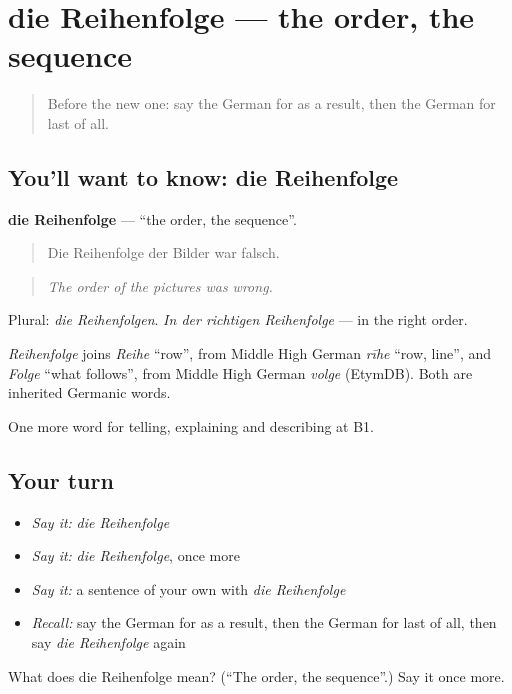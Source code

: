 \section[die Reihenfolge]{die Reihenfolge — the order, the sequence}

\label{lesson:GE-C262-reihenfolge}



\begin{quote}
Before the new one: say the German for as a result, then the German for last of all.
\end{quote}

\subsection*{You'll want to know: die Reihenfolge}
\textbf{die Reihenfolge} — \textquotedblleft{}the order, the sequence\textquotedblright{}.

\begin{quote}
Die Reihenfolge der Bilder war falsch.
\end{quote}

\begin{quote}
\emph{The order of the pictures was wrong.}
\end{quote}

Plural: \emph{die Reihenfolgen}. \emph{In der richtigen Reihenfolge} — in the right order.

\begin{cousinweb}
\emph{Reihenfolge} joins \emph{Reihe} \textquotedblleft{}row\textquotedblright{}, from Middle High German \emph{rīhe} \textquotedblleft{}row, line\textquotedblright{}, and \emph{Folge} \textquotedblleft{}what follows\textquotedblright{}, from Middle High German \emph{volge} (EtymDB). Both are inherited Germanic words.
\end{cousinweb}

\begin{grammarlens}[title={What you've built}]
One more word for telling, explaining and describing at B1.
\end{grammarlens}

\subsection*{Your turn}
\begin{itemize}
\raggedright
  \item \emph{Say it:} \emph{die Reihenfolge}
  \item \emph{Say it:} \emph{die Reihenfolge}, once more
  \item \emph{Say it:} a sentence of your own with \emph{die Reihenfolge}
  \item \emph{Recall:} say the German for as a result, then the German for last of all, then say \emph{die Reihenfolge} again
\end{itemize}

\begin{tcolorbox}[breakable,colback=teal!4,colframe=teal!35!black,title={Before you move on}]
What does die Reihenfolge mean? (\textquotedblleft{}The order, the sequence\textquotedblright{}.) Say it once more.
\end{tcolorbox}
